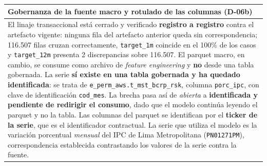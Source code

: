 \documentclass[12pt, a4paper]{article}
\newenvironment{recuadro}[1]
{\begin{center}\begin{tabular}{|p{0.92\textwidth}|}
\hline
\rowcolor{grissuave}
\textbf{#1} \\ \hline
}
{\\ \hline \end{tabular}\end{center}}
\begin{document}
\begin{recuadro}{Gobernanza de la fuente macro y rotulado de las columnas (D-06b)}
El linaje transaccional está cerrado y verificado \textbf{registro a registro} contra el artefacto
vigente: ninguna fila del artefacto anterior queda sin correspondencia; 116.507 filas cruzan
correctamente, \texttt{target\_1m} coincide en el 100\% de los casos y \texttt{target\_12m}
presenta 2 discrepancias sobre 116.507. El parquet macro, en cambio, se consume como archivo de
\emph{feature engineering} y \textbf{no} desde una tabla gobernada. La serie \textbf{sí existe en
una tabla gobernada y ha quedado identificada}: se trata de
\texttt{e\_perm\_aws.t\_mst\_bcrp\_rsk}, columna \texttt{porc\_ipc}, con clave de identificación
\texttt{cod\_mes}. La brecha pasa así de \emph{abierta} a \textbf{identificada y pendiente de
redirigir el consumo}, dado que el modelo continúa leyendo el parquet y no la tabla. Las columnas del parquet se identifican por el \textbf{ticker de la serie}, que es el
identificador contractual. La serie que utiliza el modelo es la variación porcentual
\emph{mensual} del IPC de Lima Metropolitana (\texttt{PN01271PM}), correspondencia
establecida contrastando los valores de la serie contra la fuente.
\end{recuadro}

\begin{table}[H]
\centering
\caption{Series de IPC de Lima Metropolitana disponibles en el parquet, con el ticker BCRP que identifica a cada una y su verificación por reconstrucción.}
\label{tab:rotulos}
\small
{}
\end{table}
\end{document}
